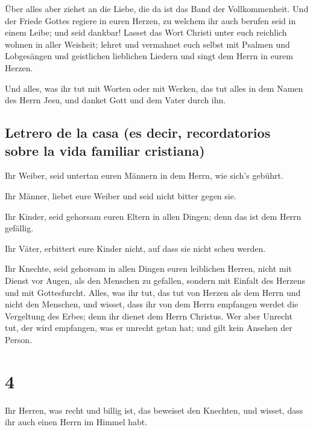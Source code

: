  Über alles aber ziehet an die Liebe, die da ist das Band
der Vollkommenheit.  Und der Friede Gottes regiere in
euren Herzen, zu welchem ihr auch berufen seid in einem Leibe; und seid
dankbar!  Lasset das Wort Christi unter euch reichlich
wohnen in aller Weisheit; lehret und vermahnet euch selbst mit Psalmen
und Lobgesängen und geistlichen lieblichen Liedern und singt dem Herrn
in eurem Herzen.

 Und alles, was ihr tut mit Worten oder mit Werken, das
tut alles in dem Namen des Herrn Jesu, und danket Gott und dem Vater
durch ihn.

\hypertarget{letrero-de-la-casa-es-decir-recordatorios-sobre-la-vida-familiar-cristiana}{%
\subsection{Letrero de la casa (es decir, recordatorios sobre la vida
familiar
cristiana)}\label{letrero-de-la-casa-es-decir-recordatorios-sobre-la-vida-familiar-cristiana}}

 Ihr Weiber, seid untertan euren Männern in dem Herrn,
wie sich's gebührt.

 Ihr Männer, liebet eure Weiber und seid nicht bitter
gegen sie.

 Ihr Kinder, seid gehorsam euren Eltern in allen Dingen;
denn das ist dem Herrn gefällig.

 Ihr Väter, erbittert eure Kinder nicht, auf dass sie
nicht scheu werden.

 Ihr Knechte, seid gehorsam in allen Dingen euren
leiblichen Herren, nicht mit Dienst vor Augen, als den Menschen zu
gefallen, sondern mit Einfalt des Herzens und mit Gottesfurcht.
 Alles, was ihr tut, das tut von Herzen als dem Herrn und
nicht den Menschen,  und wisset, dass ihr von dem Herrn
empfangen werdet die Vergeltung des Erbes; denn ihr dienet dem Herrn
Christus.  Wer aber Unrecht tut, der wird empfangen, was
er unrecht getan hat; und gilt kein Ansehen der Person.

\hypertarget{section-3}{%
\section{4}\label{section-3}}

 Ihr Herren, was recht und billig ist, das beweiset den
Knechten, und wisset, dass ihr auch einen Herrn im Himmel habt.

